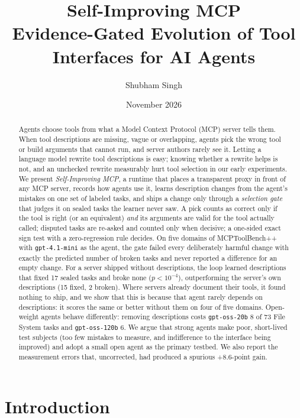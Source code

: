 \documentclass[11pt]{article}
\title{\textbf{Self-Improving MCP}\\[4pt]\large Evidence-Gated Evolution of Tool Interfaces for AI Agents}
\author{Shubham Singh}
\date{November 2026}
\begin{document}
\maketitle

\begin{abstract}
Agents choose tools from what a Model Context Protocol (MCP) server tells them. When tool descriptions are missing, vague or
overlapping, agents pick the wrong tool or build arguments that cannot run, and server authors rarely see it. Letting a language
model rewrite tool descriptions is easy; knowing whether a rewrite helps is not, and an unchecked rewrite measurably hurt tool
selection in our early experiments. We present \emph{Self-Improving MCP}, a runtime that places a transparent proxy in front of
any MCP server, records how agents use it, learns description changes from the agent's mistakes on one set of labeled tasks, and
ships a change only through a \emph{selection gate} that judges it on sealed tasks the learner never saw. A pick counts as correct
only if the tool is right (or an equivalent) \emph{and} its arguments are valid for the tool actually called; disputed tasks are
re-asked and counted only when decisive; a one-sided exact sign test with a zero-regression rule decides. On five domains of
MCPToolBench++ with \texttt{gpt-4.1-mini} as the agent, the gate failed every deliberately harmful change with exactly the
predicted number of broken tasks and never reported a difference for an empty change. For a server shipped without
descriptions, the loop learned descriptions that fixed 17 sealed tasks and broke none ($p<10^{-4}$), outperforming the server's
own descriptions (15 fixed, 2 broken). Where servers already document their tools, it found nothing to ship, and we show that
this is because that agent rarely depends on descriptions: it scores the same or better without them on four of five domains.
Open-weight agents behave differently: removing descriptions costs \texttt{gpt-oss-20b} 8 of 73 File System tasks and
\texttt{gpt-oss-120b} 6. We argue that strong agents make poor, short-lived test subjects (too few mistakes to measure, and
indifference to the interface being improved) and adopt a small open agent as the primary testbed. We also report the
measurement errors that, uncorrected, had produced a spurious +8.6-point gain.
\end{abstract}

\section{Introduction}
\end{document}
